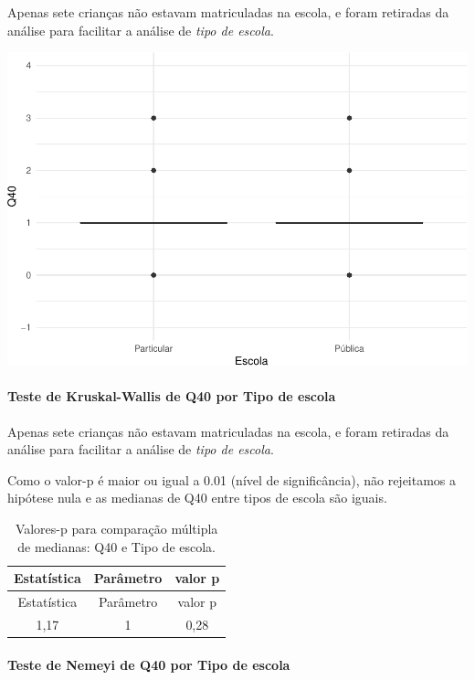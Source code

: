 \documentclass[]{article}
\let\oldparagraph\paragraph
\renewcommand{\paragraph}[1]{\oldparagraph{#1}\mbox{}}
\begin{document}
Apenas sete crianças não estavam matriculadas na escola, e foram retiradas da análise para facilitar a análise de \emph{tipo de escola}.

\begin{center}\includegraphics[width=0.75\linewidth]{relatorio_covid19_files/figure-latex/unnamed-chunk-1591-1} \end{center}

\hypertarget{teste-de-kruskal-wallis-de-q40-por-tipo-de-escola}{%
\paragraph{Teste de Kruskal-Wallis de Q40 por Tipo de escola}\label{teste-de-kruskal-wallis-de-q40-por-tipo-de-escola}}

Apenas sete crianças não estavam matriculadas na escola, e foram retiradas da análise para facilitar a análise de \emph{tipo de escola}.

Como o valor-p é maior ou igual a 0.01 (nível de significância), não rejeitamos a hipótese nula e as medianas de Q40 entre tipos de escola são iguais.

\begin{longtable}[]{@{}ccc@{}}
\caption{\label{tab:unnamed-chunk-1593}Valores-p para comparação múltipla de medianas: Q40 e Tipo de escola.}\tabularnewline
\toprule
Estatística & Parâmetro & valor p\tabularnewline
\midrule
\endfirsthead
\toprule
Estatística & Parâmetro & valor p\tabularnewline
\midrule
\endhead
1,17 & 1 & 0,28\tabularnewline
\bottomrule
\end{longtable}

\hypertarget{teste-de-nemeyi-de-q40-por-tipo-de-escola}{%
\paragraph{Teste de Nemeyi de Q40 por Tipo de escola}\label{teste-de-nemeyi-de-q40-por-tipo-de-escola}}
\end{document}
